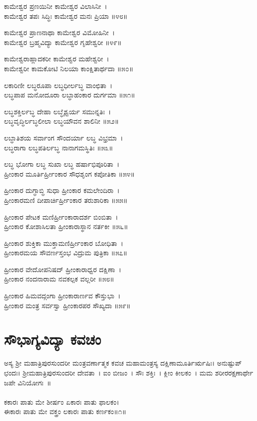 {ಕಾಮೇಶ್ವರ ಪ್ರಣಯಿನೀ ಕಾಮೇಶ್ವರ ವಿಲಾಸಿನೀ~।\\
ಕಾಮೇಶ್ವರ ತಪಃ ಸಿದ್ಧಿಃ ಕಾಮೇಶ್ವರ ಮನಃ ಪ್ರಿಯಾ ॥೪೮॥

ಕಾಮೇಶ್ವರ ಪ್ರಾಣನಾಥಾ ಕಾಮೇಶ್ವರ ವಿಮೋಹಿನೀ~।\\
ಕಾಮೇಶ್ವರ ಬ್ರಹ್ಮವಿದ್ಯಾ ಕಾಮೇಶ್ವರ ಗೃಹೇಶ್ವರೀ ॥೪೯॥

ಕಾಮೇಶ್ವರಾಹ್ಲಾದಕರೀ ಕಾಮೇಶ್ವರ ಮಹೇಶ್ವರೀ~।\\
ಕಾಮೇಶ್ವರೀ ಕಾಮಕೋಟಿ ನಿಲಯಾ ಕಾಂಕ್ಷಿತಾರ್ಥದಾ ॥೫೦॥

ಲಕಾರಿಣೀ ಲಬ್ಧರೂಪಾ ಲಬ್ಧಧೀರ್ಲಬ್ಧ ವಾಂಛಿತಾ~।\\
ಲಬ್ಧಪಾಪ ಮನೋದೂರಾ ಲಬ್ಧಾಹಂಕಾರ ದುರ್ಗಮಾ ॥೫೧॥

ಲಬ್ಧಶಕ್ತಿರ್ಲಬ್ಧ ದೇಹಾ ಲಬ್ಧೈಶ್ವರ್ಯ ಸಮುನ್ನತಿಃ~।\\
ಲಬ್ಧವೃದ್ಧಿರ್ಲಬ್ಧಲೀಲಾ ಲಬ್ಧಯೌವನ ಶಾಲಿನೀ ॥೫೨॥

ಲಬ್ಧಾತಿಶಯ ಸರ್ವಾಂಗ ಸೌಂದರ್ಯಾ ಲಬ್ಧ ವಿಭ್ರಮಾ~।\\
ಲಬ್ಧರಾಗಾ ಲಬ್ಧಪತಿರ್ಲಬ್ಧ ನಾನಾಗಮಸ್ಥಿತಿಃ ॥೫೩॥

ಲಬ್ಧ ಭೋಗಾ ಲಬ್ಧ ಸುಖಾ ಲಬ್ಧ ಹರ್ಷಾಭಿಪೂರಿತಾ~।\\
ಹ್ರೀಂಕಾರ ಮೂರ್ತಿರ್ಹ್ರೀಂಕಾರ ಸೌಧಶೃಂಗ ಕಪೋತಿಕಾ ॥೫೪॥

ಹ್ರೀಂಕಾರ ದುಗ್ಧಾಬ್ಧಿ ಸುಧಾ ಹ್ರೀಂಕಾರ ಕಮಲೇಂದಿರಾ~।\\
ಹ್ರೀಂಕಾರಮಣಿ ದೀಪಾರ್ಚಿರ್ಹ್ರೀಂಕಾರ ತರುಶಾರಿಕಾ ॥೫೫॥

ಹ್ರೀಂಕಾರ ಪೇಟಕ ಮಣಿರ್ಹ್ರೀಂಕಾರಾದರ್ಶ ಬಿಂಬಿತಾ~।\\
ಹ್ರೀಂಕಾರ ಕೋಶಾಸಿಲತಾ ಹ್ರೀಂಕಾರಾಸ್ಥಾನ ನರ್ತಕೀ ॥೫೬॥

ಹ್ರೀಂಕಾರ ಶುಕ್ತಿಕಾ ಮುಕ್ತಾಮಣಿರ್ಹ್ರೀಂಕಾರ ಬೋಧಿತಾ~।\\
ಹ್ರೀಂಕಾರಮಯ ಸೌವರ್ಣಸ್ತಂಭ ವಿದ್ರುಮ ಪುತ್ರಿಕಾ ॥೫೭॥

ಹ್ರೀಂಕಾರ ವೇದೋಪನಿಷದ್ ಹ್ರೀಂಕಾರಾಧ್ವರ ದಕ್ಷಿಣಾ~।\\
ಹ್ರೀಂಕಾರ ನಂದನಾರಾಮ ನವಕಲ್ಪಕ ವಲ್ಲರೀ ॥೫೮॥

ಹ್ರೀಂಕಾರ ಹಿಮವದ್ಗಂಗಾ ಹ್ರೀಂಕಾರಾರ್ಣವ ಕೌಸ್ತುಭಾ~।\\
ಹ್ರೀಂಕಾರ ಮಂತ್ರ ಸರ್ವಸ್ವಾ ಹ್ರೀಂಕಾರಪರ ಸೌಖ್ಯದಾ ॥೫೯॥}
\section{ಸೌಭಾಗ್ಯವಿದ್ಯಾ ಕವಚಂ}
ಅಸ್ಯ ಶ್ರೀ ಮಹಾತ್ರಿಪುರಸುಂದರೀ ಮಂತ್ರವರ್ಣಾತ್ಮಕ ಕವಚ ಮಹಾಮಂತ್ರಸ್ಯ ದಕ್ಷಿಣಾಮೂರ್ತಿರ್ಋಷಿಃ। ಅನುಷ್ಟುಪ್ ಛಂದಃ। ಶ್ರೀಮಹಾತ್ರಿಪುರಸುಂದರೀ ದೇವತಾ~। ಐಂ ಬೀಜಂ~। ಸೌಃ ಶಕ್ತಿಃ~। ಕ್ಲೀಂ ಕೀಲಕಂ~। ಮಮ ಶರೀರರಕ್ಷಣಾರ್ಥೇ ಜಪೇ ವಿನಿಯೋಗಃ~॥\\
\\
ಕಕಾರಃ ಪಾತು ಮೇ ಶೀರ್ಷಂ ಏಕಾರಃ ಪಾತು ಫಾಲಕಂ।\\
ಈಕಾರಃ ಪಾತು ಮೇ ವಕ್ತ್ರಂ ಲಕಾರಃ ಪಾತು ಕರ್ಣಕಂ॥೧॥

